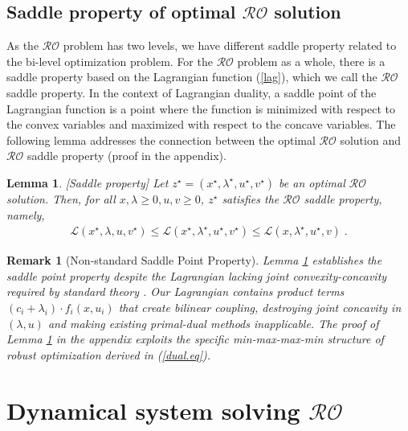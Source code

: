 \documentclass[journal,twoside,web]{ieeecolor}
\newcommand{\rev}[1]{\textcolor{revisionblue}{#1}}
\newtheorem{lemma}{Lemma}
\newtheorem{remark}{Remark}
\begin{document}
\subsection{Saddle property of optimal $\mathcal{RO}$ solution}

As the $\mathcal{RO}$ problem has two levels, we have different saddle property related to the bi-level optimization problem. For the $\mathcal{RO}$ problem as a whole, there is a saddle property based on the Lagrangian function (\ref{lag}), which we call the $\mathcal{RO}$ saddle property. In the context of Lagrangian duality, a saddle point of the Lagrangian function is a point where the function is minimized with respect to the convex variables and maximized with respect to the concave variables. The following lemma addresses the connection between the optimal $\mathcal{RO}$ solution and $\mathcal{RO}$ saddle property (proof in the appendix).

\begin{lemma} \label{saddle.lem} [Saddle property]
Let $z^\star=(x^\star,\lambda^\star,u^\star,v^\star)$ be an optimal $\mathcal{RO}$ solution. Then, for all $x,\lambda\geq 0,u,v\geq 0$\;, $z^\star$ satisfies the $\mathcal{RO}$ saddle property, namely,
\begin{align} \label{saddle}
\mathcal{L}(x^\star,\lambda,u,v^\star)\leq \mathcal{L}(x^\star,\lambda^\star,u^\star,v^\star)\leq \mathcal{L}(x,\lambda^\star,u^\star,v)\;.
\end{align}
\end{lemma}

\begin{remark}[\rev{Non-standard Saddle Point Property}]
\rev{Lemma \ref{saddle.lem} establishes the saddle point property despite the Lagrangian lacking joint convexity-concavity required by standard theory \cite{boyd2004,rockafellar1970}. Our Lagrangian contains product terms $(c_i+\lambda_i) \cdot f_i(x,u_i)$ that create bilinear coupling, destroying joint concavity in $(\lambda,u)$ and making existing primal-dual methods \cite{arrow1958,feijer2010} inapplicable. The proof of Lemma \ref{saddle.lem} in the appendix exploits the specific min-max-max-min structure of robust optimization derived in (\ref{dual.eq}).}
\end{remark}

\section{Dynamical system solving $\mathcal{RO}$} \label{section_pddynamics}
\end{document}
